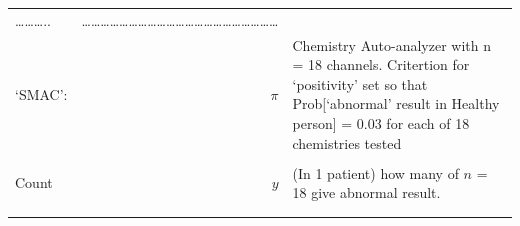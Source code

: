 \documentclass[]{book}
\begin{document}
\begin{longtable}[]{@{}lrl@{}}
\begin{minipage}[t]{0.16\columnwidth}
\ldots{}\ldots{}\ldots{}..\strut
\end{minipage} & \begin{minipage}[t]{0.16\columnwidth}\raggedright
\ldots{}\ldots{}\ldots{}\ldots{}\ldots{}\ldots{}\ldots{}\ldots{}\ldots{}\ldots{}\ldots{}\ldots{}\ldots{}\ldots{}\ldots{}\ldots{}\ldots{}\ldots{}\ldots{}\ldots{}\ldots{}\strut
\end{minipage}\tabularnewline
\begin{minipage}[t]{0.60\columnwidth}\raggedright
`SMAC':\strut
\end{minipage} & \begin{minipage}[t]{0.16\columnwidth}\raggedleft
\(\pi\)\strut
\end{minipage} & \begin{minipage}[t]{0.16\columnwidth}\raggedright
Chemistry Auto-analyzer with n = 18 channels. Critertion for `positivity' set so that Prob{[}`abnormal' result in Healthy person{]} = 0.03 for each of 18 chemistries tested\strut
\end{minipage}\tabularnewline
\begin{minipage}[t]{0.60\columnwidth}\raggedright
\strut
\end{minipage} & \begin{minipage}[t]{0.16\columnwidth}\raggedleft
\strut
\end{minipage} & \begin{minipage}[t]{0.16\columnwidth}\raggedright
\strut
\end{minipage}\tabularnewline
\begin{minipage}[t]{0.60\columnwidth}\raggedright
Count\strut
\end{minipage} & \begin{minipage}[t]{0.16\columnwidth}\raggedleft
\(y\)\strut
\end{minipage} & \begin{minipage}[t]{0.16\columnwidth}\raggedright
(In 1 patient) how many of \(n\) = 18 give abnormal result.\strut
\end{minipage}\tabularnewline
\begin{minipage}[t]{0.60\columnwidth}\raggedright
\strut
\end{minipage} & \begin{minipage}[t]{0.16\columnwidth}\raggedleft
\strut
\end{minipage} & \begin{minipage}[t]{0.16\columnwidth}\raggedright
\strut
\end{minipage}\tabularnewline
\begin{minipage}[t]{0.60\columnwidth}\raggedright

\end{minipage}
\end{longtable}
\end{document}
